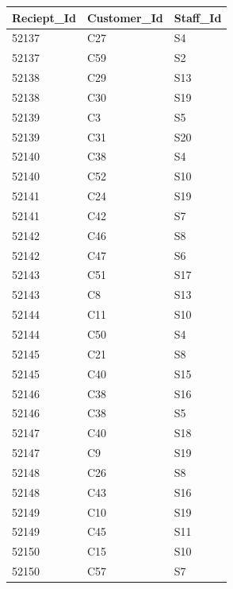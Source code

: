 \documentclass{article}
\begin{document}
    \begin{table}[]
        \centering
        \begin{tabular}{|l|l|l|}
        \hline
        Reciept\_Id & Customer\_Id & Staff\_Id \\ \hline
        52137       & C27          & S4        \\ \hline
        52137       & C59          & S2        \\ \hline
        52138       & C29          & S13       \\ \hline
        52138       & C30          & S19       \\ \hline
        52139       & C3           & S5        \\ \hline
        52139       & C31          & S20       \\ \hline
        52140       & C38          & S4        \\ \hline
        52140       & C52          & S10       \\ \hline
        52141       & C24          & S19       \\ \hline
        52141       & C42          & S7        \\ \hline
        52142       & C46          & S8        \\ \hline
        52142       & C47          & S6        \\ \hline
        52143       & C51          & S17       \\ \hline
        52143       & C8           & S13       \\ \hline
        52144       & C11          & S10       \\ \hline
        52144       & C50          & S4        \\ \hline
        52145       & C21          & S8        \\ \hline
        52145       & C40          & S15       \\ \hline
        52146       & C38          & S16       \\ \hline
        52146       & C38          & S5        \\ \hline
        52147       & C40          & S18       \\ \hline
        52147       & C9           & S19       \\ \hline
        52148       & C26          & S8        \\ \hline
        52148       & C43          & S16       \\ \hline
        52149       & C10          & S19       \\ \hline
        52149       & C45          & S11       \\ \hline
        52150       & C15          & S10       \\ \hline
        52150       & C57          & S7        \\ \hline
        \end{tabular}
    \end{table}

    
\end{document}
